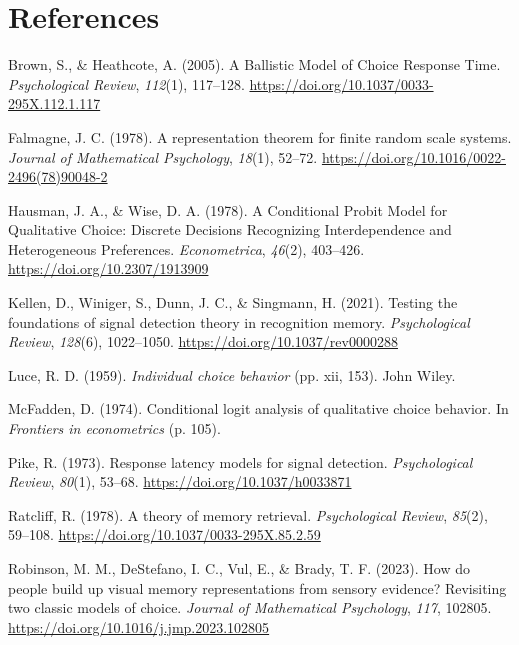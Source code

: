 \documentclass[
  man,
  floatsintext,
  longtable,
  a4paper,
  nolmodern,
  notxfonts,
  notimes,
  colorlinks=true,linkcolor=blue,citecolor=blue,urlcolor=blue]{apa7}
\newlength{\cslhangindent}
\newenvironment{CSLReferences}[2] %
 {\begin{list}{}{%
  \setlength{\itemindent}{0pt}
  \setlength{\leftmargin}{0pt}
  \setlength{\parsep}{0pt}
  \ifodd #1
   \setlength{\leftmargin}{\cslhangindent}
   \setlength{\itemindent}{-1\cslhangindent}
  \fi
  \setlength{\itemsep}{#2\baselineskip}}}
 {\end{list}}
\begin{document}
\section{References}\label{references}

\label{refs}
\begin{CSLReferences}{1}{0}
Brown, S., \& Heathcote, A. (2005). A {Ballistic Model} of {Choice
Response Time}. \emph{Psychological Review}, \emph{112}(1), 117--128.
\url{https://doi.org/10.1037/0033-295X.112.1.117}

Falmagne, J. C. (1978). A representation theorem for finite random scale
systems. \emph{Journal of Mathematical Psychology}, \emph{18}(1),
52--72. \url{https://doi.org/10.1016/0022-2496(78)90048-2}

Hausman, J. A., \& Wise, D. A. (1978). A {Conditional Probit Model} for
{Qualitative Choice}: {Discrete Decisions Recognizing Interdependence}
and {Heterogeneous Preferences}. \emph{Econometrica}, \emph{46}(2),
403--426. \url{https://doi.org/10.2307/1913909}

Kellen, D., Winiger, S., Dunn, J. C., \& Singmann, H. (2021). Testing
the foundations of signal detection theory in recognition memory.
\emph{Psychological Review}, \emph{128}(6), 1022--1050.
\url{https://doi.org/10.1037/rev0000288}

Luce, R. D. (1959). \emph{Individual choice behavior} (pp. xii, 153).
John Wiley.

McFadden, D. (1974). Conditional logit analysis of qualitative choice
behavior. In \emph{Frontiers in econometrics} (p. 105).

Pike, R. (1973). Response latency models for signal detection.
\emph{Psychological Review}, \emph{80}(1), 53--68.
\url{https://doi.org/10.1037/h0033871}

Ratcliff, R. (1978). A theory of memory retrieval. \emph{Psychological
Review}, \emph{85}(2), 59--108.
\url{https://doi.org/10.1037/0033-295X.85.2.59}

Robinson, M. M., DeStefano, I. C., Vul, E., \& Brady, T. F. (2023). How
do people build up visual memory representations from sensory evidence?
{Revisiting} two classic models of choice. \emph{Journal of Mathematical
Psychology}, \emph{117}, 102805.
\url{https://doi.org/10.1016/j.jmp.2023.102805}


\end{CSLReferences}
\end{document}
